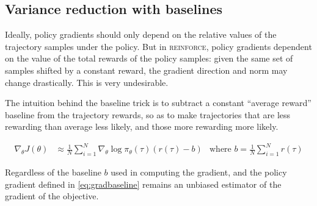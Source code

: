 \documentclass{article}
\begin{document}
\subsection{Variance reduction with baselines}

Ideally, policy gradients should only depend on the relative values of the trajectory samples under the policy. But in \textsc{reinforce}, policy gradients dependent on the value of the total rewards of the policy samples: given the same set of samples shifted by a constant reward, the gradient direction and norm may change drastically. This is very undesirable.

The intuition behind the baseline trick is to subtract a constant ``average reward'' baseline from the trajectory rewards, so as to make trajectories that are less rewarding than average less likely, and those more rewarding more likely.

\begin{align}
    \nabla_\theta J(\theta) 
      &\approx \frac{1}{N} \sum_{i=1}^N\nabla_\theta\log\pi_\theta\left(\tau\right)\left(r\left(\tau\right)-b\right) &\text{where }b=\frac{1}{N} \sum_{i=1}^{N} r(\tau) \label{eq:gradbaseline}
\end{align}

Regardless of the baseline $b$ used in computing the gradient, and the policy gradient defined in \eqref{eq:gradbaseline} remains an unbiased estimator of the gradient of the objective.
\end{document}
